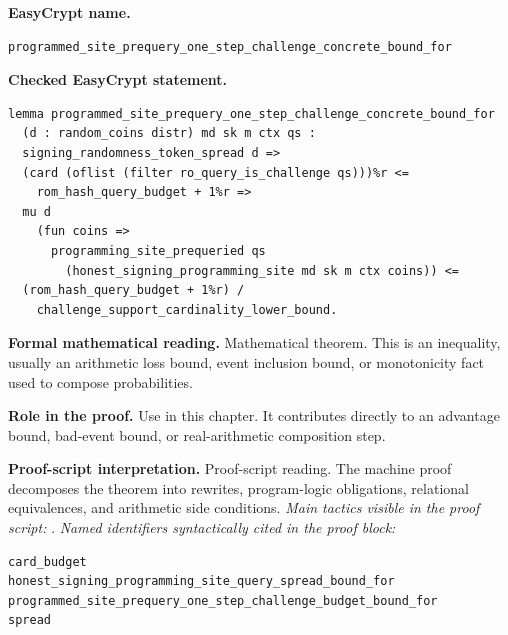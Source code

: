 \begin{formaltheorem}
\noindent\textbf{EasyCrypt name.}
\begin{lstlisting}[language=EasyCrypt,basicstyle=\ttfamily\scriptsize]
programmed_site_prequery_one_step_challenge_concrete_bound_for
\end{lstlisting}
\noindent\textbf{Checked EasyCrypt statement.}
\begin{lstlisting}[language=EasyCrypt,basicstyle=\ttfamily\scriptsize]
lemma programmed_site_prequery_one_step_challenge_concrete_bound_for
  (d : random_coins distr) md sk m ctx qs :
  signing_randomness_token_spread d =>
  (card (oflist (filter ro_query_is_challenge qs)))%r <=
    rom_hash_query_budget + 1%r =>
  mu d
    (fun coins =>
      programming_site_prequeried qs
        (honest_signing_programming_site md sk m ctx coins)) <=
  (rom_hash_query_budget + 1%r) /
    challenge_support_cardinality_lower_bound.
\end{lstlisting}
\noindent\textbf{Formal mathematical reading.}
Mathematical theorem. This is an inequality, usually an arithmetic loss bound, event inclusion bound, or monotonicity fact used to compose probabilities.

\noindent\textbf{Role in the proof.}
Use in this chapter. It contributes directly to an advantage bound, bad-event bound, or real-arithmetic composition step.

\noindent\textbf{Proof-script interpretation.}
Proof-script reading. The machine proof decomposes the theorem into rewrites, program-logic obligations, relational equivalences, and arithmetic side conditions.
\emph{Main tactics visible in the proof script:} .
\emph{Named identifiers syntactically cited in the proof block:}
\begin{lstlisting}[language=EasyCrypt,basicstyle=\ttfamily\scriptsize]
card_budget
honest_signing_programming_site_query_spread_bound_for
programmed_site_prequery_one_step_challenge_budget_bound_for
spread
\end{lstlisting}

\end{formaltheorem}

